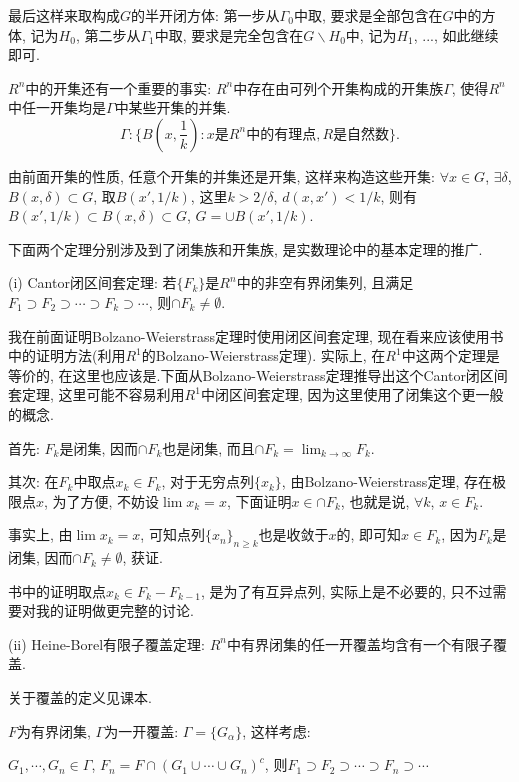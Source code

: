 \documentclass[12pt,a4paper,openany]{book}
\begin{document}
最后这样来取构成$G$的半开闭方体: 第一步从$\Gamma_0$中取, 要求是全部包含在$G$中的方体, 记为$H_0$, 第二步从$\Gamma_1$中取, 要求是完全包含在$G\backslash H_0$中, 记为$H_1$, ..., 如此继续即可.

$R^n$中的开集还有一个重要的事实: $R^n$中存在由可列个开集构成的开集族$\Gamma$, 使得$R^n$中任一开集均是$\Gamma$中某些开集的并集. 
\[
\Gamma:\{B(x, \frac{1}{k}) : x\text{是}R^n\text{中的有理点}, R\text{是自然数}\}.
\]

由前面开集的性质, 任意个开集的并集还是开集, 这样来构造这些开集: $\forall x \in G$, $\exists \delta$, $B(x, \delta) \subset G$, 取$B(x', 1/k)$, 这里$k > 2/\delta$, $d(x, x') < 1/k$, 则有$B(x', 1/k) \subset B(x, \delta) \subset G$, $G = \cup{B(x', 1/k)}$.

下面两个定理分别涉及到了闭集族和开集族, 是实数理论中的基本定理的推广.

(i) Cantor闭区间套定理: 若$\{F_k\}$是$R^n$中的非空有界闭集列, 且满足$F_1 \supset F_2 \supset \cdots \supset F_k \supset \cdots$, 则$\cap{F_k} \neq \emptyset$.

我在前面证明Bolzano-Weierstrass定理时使用闭区间套定理, 现在看来应该使用书中的证明方法(利用$R^1$的Bolzano-Weierstrass定理). 实际上, 在$R^1$中这两个定理是等价的, 在这里也应该是.下面从Bolzano-Weierstrass定理推导出这个Cantor闭区间套定理, 这里可能不容易利用$R^1$中闭区间套定理, 因为这里使用了闭集这个更一般的概念.

首先: $F_k$是闭集, 因而$\cap{F_k}$也是闭集, 而且$\cap{F_k} = \lim_{k \rightarrow \infty}{F_k}$.

其次: 在$F_k$中取点$x_k \in F_k$, 对于无穷点列$\{x_k\}$, 由Bolzano-Weierstrass定理, 存在极限点$x$, 为了方便, 不妨设$\lim{x_k} = x$, 下面证明$x \in \cap{F_k}$, 也就是说, $\forall k$, $x \in F_k$.

事实上, 由$\lim{x_k} = x$, 可知点列$\{x_n\}_{n \ge k}$也是收敛于$x$的, 即可知$x \in F_k$, 因为$F_k$是闭集, 因而$\cap{F_k} \neq \emptyset$, 获证.

书中的证明取点$x_k \in F_k - F_{k-1}$, 是为了有互异点列, 实际上是不必要的, 只不过需要对我的证明做更完整的讨论.

(ii) Heine-Borel有限子覆盖定理: $R^n$中有界闭集的任一开覆盖均含有一个有限子覆盖.

关于覆盖的定义见课本.

$F$为有界闭集, $\Gamma$为一开覆盖: $\Gamma = \{G_{\alpha}\}$, 这样考虑:

$G_1, \cdots, G_n \in \Gamma$, $F_n = F \cap (G_1 \cup \cdots \cup G_n)^c$, 则$F_1 \supset F_2 \supset \cdots \supset F_n \supset \cdots$
\end{document}
